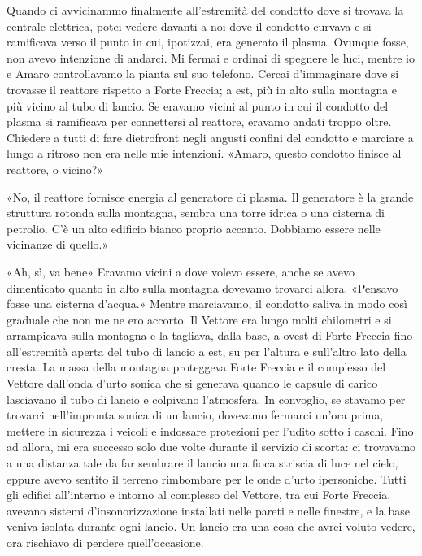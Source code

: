 Quando ci avvicinammo finalmente all'estremità del condotto dove si
trovava la centrale elettrica, potei vedere davanti a noi dove il
condotto curvava e si ramificava verso il punto in cui, ipotizzai, era
generato il plasma. Ovunque fosse, non avevo intenzione di andarci. Mi
fermai e ordinai di spegnere le luci, mentre io e Amaro controllavamo la
pianta sul suo telefono. Cercai d'immaginare dove si trovasse il
reattore rispetto a Forte Freccia; a est, più in alto sulla montagna e
più vicino al tubo di lancio. Se eravamo vicini al punto in cui il
condotto del plasma si ramificava per connettersi al reattore, eravamo
andati troppo oltre. Chiedere a tutti di fare dietrofront negli angusti
confini del condotto e marciare a lungo a ritroso non era nelle mie
intenzioni. «Amaro, questo condotto finisce al reattore, o vicino?»

«No, il reattore fornisce energia al generatore di plasma. Il generatore
è la grande struttura rotonda sulla montagna, sembra una torre idrica o
una cisterna di petrolio. C'è un alto edificio bianco proprio accanto.
Dobbiamo essere nelle vicinanze di quello.»

«Ah, sì, va bene» Eravamo vicini a dove volevo essere, anche se avevo
dimenticato quanto in alto sulla montagna dovevamo trovarci allora.
«Pensavo fosse una cisterna d'acqua.» Mentre marciavamo, il condotto
saliva in modo così graduale che non me ne ero accorto. Il Vettore era
lungo molti chilometri e si arrampicava sulla montagna e la tagliava,
dalla base, a ovest di Forte Freccia fino all'estremità aperta del tubo
di lancio a est, su per l'altura e sull'altro lato della cresta. La
massa della montagna proteggeva Forte Freccia e il complesso del Vettore
dall'onda d'urto sonica che si generava quando le capsule di carico
lasciavano il tubo di lancio e colpivano l'atmosfera. In convoglio, se
stavamo per trovarci nell'impronta sonica di un lancio, dovevamo
fermarci un'ora prima, mettere in sicurezza i veicoli e indossare
protezioni per l'udito sotto i caschi. Fino ad allora, mi era successo
solo due volte durante il servizio di scorta: ci trovavamo a una
distanza tale da far sembrare il lancio una fioca striscia di luce nel
cielo, eppure avevo sentito il terreno rimbombare per le onde d'urto
ipersoniche. Tutti gli edifici all'interno e intorno al complesso del
Vettore, tra cui Forte Freccia, avevano sistemi d'insonorizzazione
installati nelle pareti e nelle finestre, e la base veniva isolata
durante ogni lancio. Un lancio era una cosa che avrei voluto vedere, ora
rischiavo di perdere quell'occasione.

